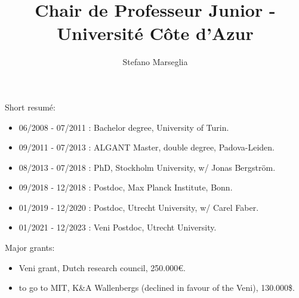 \documentclass[usenames,dvipsnames]{beamer}
\title[CPJ - Université Côte d'Azur]{Chair de Professeur Junior - Université Côte d'Azur}
\subtitle{}
\author[Stefano Marseglia]{Stefano Marseglia}
\date[21 June 2022 ]{}
\begin{document}
\begin{frame}
\titlepage
{ \vspace{-1.5cm}\footnotesize
Short resum\'e:
\begin{itemize}
     \item 06/2008 - 07/2011 : Bachelor degree, University of Turin.
     \item 09/2011 - 07/2013 : ALGANT Master, double degree, Padova-Leiden.
     \item 08/2013 - 07/2018 : PhD, Stockholm University, w/ Jonas Bergstr\"om.
     \item 09/2018 - 12/2018 : Postdoc, Max Planck Institute, Bonn.
     \item 01/2019 - 12/2020 : Postdoc, Utrecht University, w/ Carel Faber.
     \item 01/2021 - 12/2023 : Veni Postdoc, Utrecht University.
\end{itemize}
Major grants:
\begin{itemize}
     \item Veni grant, Dutch research council, 250.000\euro.
     \item to go to MIT, K\&A Wallenbergs (declined in favour of the Veni), 130.000\$.
\end{itemize}
}
\end{frame}
\end{document}
